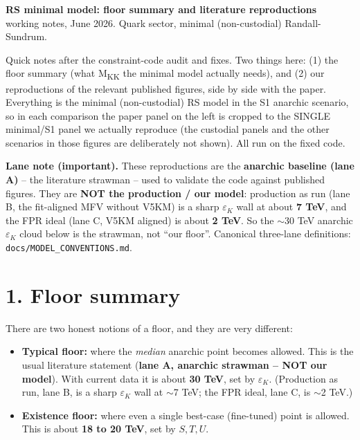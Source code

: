 \documentclass[11pt]{article}
\begin{document}
{\large \textbf{RS minimal model: floor summary and literature reproductions}}\\
{\small working notes, June 2026. Quark sector, minimal (non-custodial) Randall-Sundrum.}

\vspace{0.5em}
Quick notes after the constraint-code audit and fixes. Two things here: (1) the floor
summary (what M\textsubscript{KK} the minimal model actually needs), and (2) our reproductions
of the relevant published figures, side by side with the paper. Everything is the minimal
(non-custodial) RS model in the S1 anarchic scenario, so in each comparison the paper panel on
the left is cropped to the SINGLE minimal/S1 panel we actually reproduce (the custodial panels
and the other scenarios in those figures are deliberately not shown). All run on the fixed code.

\textbf{Lane note (important).} These reproductions are the \textbf{anarchic baseline (lane A)}
-- the literature strawman -- used to validate the code against published figures. They are
\textbf{NOT the production / our model}: production as run (lane B, the fit-aligned MFV without
V5KM) is a sharp $\varepsilon_K$ wall at about \textbf{7 TeV}, and the FPR ideal (lane C, V5KM
aligned) is about \textbf{2 TeV}. So the $\sim$30 TeV anarchic $\varepsilon_K$ cloud below is the
strawman, not ``our floor''. Canonical three-lane definitions: \texttt{docs/MODEL\_CONVENTIONS.md}.

\hrulefill

\section*{1. Floor summary}

There are two honest notions of a floor, and they are very different:

\begin{itemize}
\item \textbf{Typical floor:} where the \emph{median} anarchic point becomes allowed. This is
the usual literature statement (\textbf{lane A, anarchic strawman -- NOT our model}). With current
data it is about \textbf{30 TeV}, set by $\varepsilon_K$. (Production as run, lane B, is a sharp
$\varepsilon_K$ wall at $\sim$7 TeV; the FPR ideal, lane C, is $\sim$2 TeV.)
\item \textbf{Existence floor:} where even a single best-case (fine-tuned) point is allowed. This
is about \textbf{18 to 20 TeV}, set by $S,T,U$.
\end{itemize}
\end{document}
